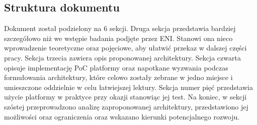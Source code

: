 \subsection{Struktura dokumentu}

Dokument został podzielony na 6 sekcji. Druga sekcja przedstawia bardziej szczegółowo niż we wstępie badania podjęte przez ENI. Stanowi ona nieco wprowadzenie teoretyczne oraz pojęciowe, aby ułatwić przekaz w dalszej części pracy. Sekcja trzecia zawiera opis proponowanej architektury. Sekcja czwarta opisuje implementację PoC platformy oraz napotkane wyzwania podczas formułowania architektury, które celowo zostały zebrane w jedno miejsce i umieszczone oddzielnie w celu łatwiejszej lektury. Sekcja numer pięć przedstawia użycie platformy w praktyce przy okazji stanowiąc jej test. Na koniec, w sekcji szóstej przeprowadzono analizę zaproponowanej architektury, przedstawiono jej możliwości oraz ograniczenia oraz wskazano kierunki potencjalnego rozwoju.
